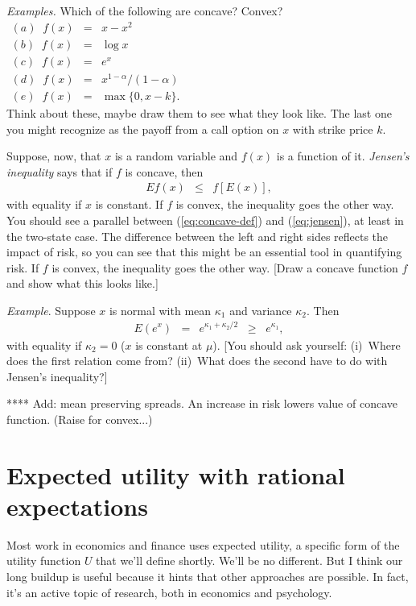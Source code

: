 {\it Examples.\/}
Which of the following are concave?  Convex?
\begin{eqnarray*}
    (a) \;\; f(x) &=& x - x^2 \\
    (b) \;\; f(x) &=& \log x  \\
    (c) \;\; f(x) &=& e^x \\
    (d) \;\; f(x) &=& x^{1-\alpha}/(1-\alpha) \\
    (e) \;\; f(x) &=& \max \{ 0, x-k \} .
    \phantom{xxxxxxxxxxxxxxxxxxxxxxxxxxxxxxxxxxxxxxx}
\end{eqnarray*}
Think about these, maybe draw them to see what they look like.
The last one you might recognize as the payoff from
a call option on $x$ with strike price $k$.


Suppose, now, that $x$ is a random variable and $f(x)$ is a function
of it.
{\it Jensen's inequality\/} says that if $f$ is concave, then
\begin{eqnarray}
    E f(x) &\leq& f [E(x)] ,
    \label{eq:jensen}
\end{eqnarray}
with equality if $x$ is constant.
If $f$ is convex, the inequality goes the other way.
You should see a parallel between
(\ref{eq:concave-def}) and (\ref{eq:jensen}), at least in the two-state case.
The difference between the left and right sides reflects
the impact of risk, so you can see that this might be
an essential tool in quantifying risk.
If $f$ is convex, the inequality goes the other way.
[Draw a concave function $f$ and show what this looks like.]

{\it Example\/}.
Suppose $x$ is normal with mean $\kappa_1$ and variance $\kappa_2$.
Then
\begin{eqnarray*}
    E \left( e^x \right) &=&  e^{\kappa_1 + \kappa_2/2}
            \;\;\geq\;\; e^{\kappa_1},
\end{eqnarray*}
with equality if $\kappa_2 = 0$ ($x$ is constant at $\mu$).
[You should ask yourself:
(i)~Where does the first relation come from?
(ii)~What does the second have to do with Jensen's inequality?]

**** Add:  mean preserving spreads.  An increase in risk lowers value of concave function.
(Raise for convex...)


\section{Expected utility with rational expectations}

Most work in economics and finance uses expected utility,
a specific form of the utility function $U$ that we'll define shortly.
We'll be no different.
But I think our long buildup is useful because it hints
that other approaches are possible.
In fact, it's an active topic of research,
both in economics and psychology.

